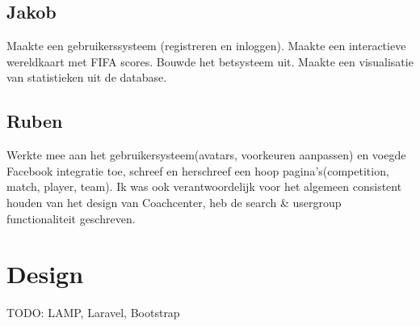 \documentclass[11pt, a4paper]{article}
\begin{document}
\subsection{Jakob}
Maakte een gebruikerssysteem (registreren en inloggen). Maakte een interactieve wereldkaart met FIFA scores. Bouwde het betsysteem uit. Maakte een visualisatie van statistieken uit de database.
\subsection{Ruben}
Werkte mee aan het gebruikersysteem(avatars, voorkeuren aanpassen) en voegde Facebook integratie toe, schreef en herschreef een hoop pagina's(competition, match, player, team). Ik was ook verantwoordelijk voor het algemeen consistent houden van het design van Coachcenter, heb de search & usergroup functionaliteit geschreven.

\section{Design}
TODO: LAMP, Laravel, Bootstrap
\end{document}
